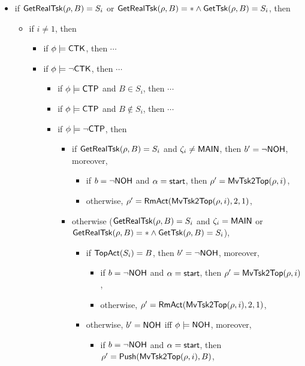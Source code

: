 \begin{itemize}
    \item if $\mathsf{GetRealTsk}(\rho, B) = S_i$ or $\mathsf{GetRealTsk}(\rho,B) = * \wedge\mathsf{GetTsk}(\rho,B) = S_i$, then
    \begin{itemize}
    \item if $i \neq 1$, then 
        \begin{itemize}
            \item if $\phi \models {\sf CTK}$, then $\cdots$ 
            \item if $\phi \models \neg {\sf CTK}$, then $\cdots$
                \begin{itemize}
                    \item if $\phi \models{\sf CTP}$ and $B \in S_i$, then $\cdots$
                    \item if $\phi \models{\sf CTP}$ and $B \notin S_i$, then $\cdots$
                    \item if $\phi \models\neg{\sf CTP}$, then
                    \begin{itemize}
							\item if $\mathsf{GetRealTsk}(\rho,B) = S_i$ and $\zeta_i \neq {\sf MAIN}$, then $b' = \neg {\sf NOH}$, moreover,
							\begin{itemize}
								\item if $b = \neg {\sf NOH}$ and $\alpha = {\mathsf{start} }$, then $\rho'=\mathsf{MvTsk2Top}(\rho, i)$,
								\item otherwise, $\rho' = \mathsf{RmAct}(\mathsf{MvTsk2Top}(\rho, i), 2, 1)$, 
							\end{itemize}
							\item otherwise ($\mathsf{GetRealTsk}(\rho,B) = S_i$ and $\zeta_i = {\sf MAIN}$ or $\mathsf{GetRealTsk}(\rho,B) = * \wedge\mathsf{GetTsk}(\rho,B) = S_i$), 
							\begin{itemize}
								\item if $\mathsf{TopAct}(S_i) = B$, then $b' = \neg {\sf NOH}$, moreover,
								\begin{itemize}
									\item if $b = \neg {\sf NOH}$ and $\alpha = {\mathsf{start} }$, then $\rho'=\mathsf{MvTsk2Top}(\rho, i)$,
									\item otherwise, $\rho' = \mathsf{RmAct}(\mathsf{MvTsk2Top}(\rho, i), 2, 1)$, 
								\end{itemize}
								\item otherwise, $b' = {\sf NOH}$ iff $\phi \models {\sf NOH}$, moreover, 
								\begin{itemize}
									\item if $b = \neg {\sf NOH}$ and $\alpha = {\mathsf{start} }$, then $\rho'=\mathsf{Push}(\mathsf{MvTsk2Top}(\rho, i), B)$,

\end{itemize}
\end{itemize}
\end{itemize}
\end{itemize}
\end{itemize}
\end{itemize}
\end{itemize}
